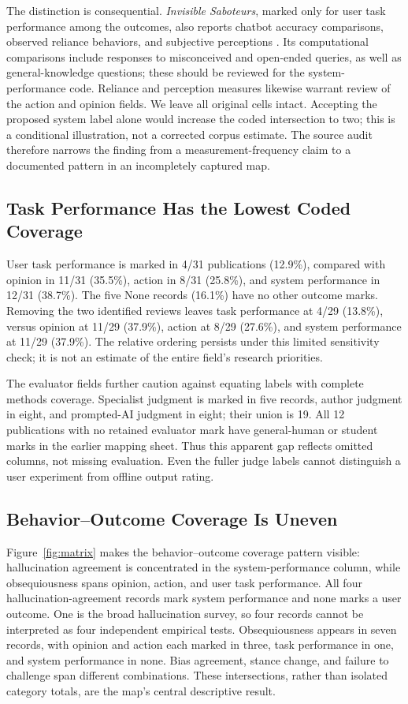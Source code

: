\documentclass[letterpaper]{article}
\begin{document}
The distinction is consequential. \emph{Invisible Saboteurs}, marked only for user task performance among the outcomes, also reports chatbot accuracy comparisons, observed reliance behaviors, and subjective perceptions \citep{10.1145/3772318.3791365}. Its computational comparisons include responses to misconceived and open-ended queries, as well as general-knowledge questions; these should be reviewed for the system-performance code. Reliance and perception measures likewise warrant review of the action and opinion fields. We leave all original cells intact. Accepting the proposed system label alone would increase the coded intersection to two; this is a conditional illustration, not a corrected corpus estimate. The source audit therefore narrows the finding from a measurement-frequency claim to a documented pattern in an incompletely captured map.

\subsection{Task Performance Has the Lowest Coded Coverage}
User task performance is marked in 4/31 publications (12.9\%), compared with opinion in 11/31 (35.5\%), action in 8/31 (25.8\%), and system performance in 12/31 (38.7\%). The five None records (16.1\%) have no other outcome marks. Removing the two identified reviews leaves task performance at 4/29 (13.8\%), versus opinion at 11/29 (37.9\%), action at 8/29 (27.6\%), and system performance at 11/29 (37.9\%). The relative ordering persists under this limited sensitivity check; it is not an estimate of the entire field's research priorities.

The evaluator fields further caution against equating labels with complete methods coverage. Specialist judgment is marked in five records, author judgment in eight, and prompted-AI judgment in eight; their union is 19. All 12 publications with no retained evaluator mark have general-human or student marks in the earlier mapping sheet. Thus this apparent gap reflects omitted columns, not missing evaluation. Even the fuller judge labels cannot distinguish a user experiment from offline output rating.

\subsection{Behavior--Outcome Coverage Is Uneven}
Figure~\ref{fig:matrix} makes the behavior--outcome coverage pattern visible: hallucination agreement is concentrated in the system-performance column, while obsequiousness spans opinion, action, and user task performance. All four hallucination-agreement records mark system performance and none marks a user outcome. One is the broad hallucination survey, so four records cannot be interpreted as four independent empirical tests. Obsequiousness appears in seven records, with opinion and action each marked in three, task performance in one, and system performance in none. Bias agreement, stance change, and failure to challenge span different combinations. These intersections, rather than isolated category totals, are the map's central descriptive result.
\end{document}

